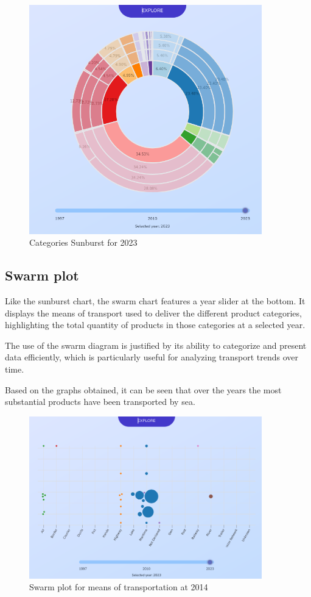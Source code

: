 \documentclass[12pt,a4]{article}
\begin{document}
\begin{figure}[H]
    \centering
    \includegraphics[width=0.9\textwidth]{assets/sun1.png}
    \caption{Categories Sunburst for 2023}
\end{figure}

\subsection{Swarm plot}
Like the sunburst chart, the swarm chart features a year slider at the bottom. It displays the means of transport used to deliver the different product categories, highlighting the total quantity of products in those categories at a selected year.

The use of the swarm diagram is justified by its ability to categorize and present data efficiently, which is particularly useful for analyzing transport trends over time.

Based on the graphs obtained, it can be seen that over the years the most substantial products have been transported by sea.

\begin{figure}[H]
    \centering
    \includegraphics[width=0.9\textwidth]{assets/swarm1.png}
    \caption{Swarm plot for means of transportation at 2014}
\end{figure}
\end{document}
